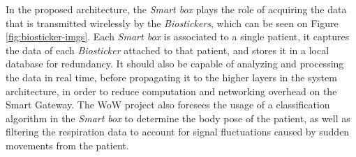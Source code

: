 
In the proposed architecture, the \textit{Smart box} plays the role of acquiring the data that is transmitted wirelessly by the \textit{Biostickers}, which can be seen on Figure \ref{fig:biosticker-imgs}.
Each \textit{Smart box} is associated to a single patient, it captures the data of each \textit{Biosticker} attached to that patient, and stores it in a local database for redundancy. 
It should also be capable of analyzing and processing the data in real time, before propagating it to the higher layers in the system architecture, in order to reduce computation and networking overhead on the Smart Gateway. The \acs{WoW} project also foresees the usage of a classification algorithm in the \textit{Smart box} to determine the body pose of the patient, as well as filtering the respiration data to account for signal fluctuations caused by sudden movements from the patient.  

